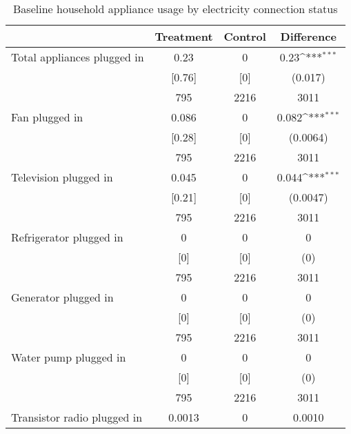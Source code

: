 \begin{table}[htbp]\centering
\def\sym#1{\ifmmode^{#1}\else\(^{#1}\)\fi}
\caption{Baseline household appliance usage by electricity connection status \label{tab:"balance"}}
\begin{tabular*}{0.9\hsize}{@{\hskip\tabcolsep\extracolsep\fill}l*{1}{ccc}}
\toprule
                                &Treatment&  Control&Difference         \\
\midrule
Total appliances plugged in     &     0.23&        0&     0.23\sym{***}\\
                                &   [0.76]&      [0]&  (0.017)         \\
                                &      795&     2216&     3011         \\
Fan plugged in                  &    0.086&        0&    0.082\sym{***}\\
                                &   [0.28]&      [0]& (0.0064)         \\
                                &      795&     2216&     3011         \\
Television plugged in           &    0.045&        0&    0.044\sym{***}\\
                                &   [0.21]&      [0]& (0.0047)         \\
                                &      795&     2216&     3011         \\
Refrigerator plugged in         &        0&        0&        0         \\
                                &      [0]&      [0]&      (0)         \\
                                &      795&     2216&     3011         \\
Generator plugged in            &        0&        0&        0         \\
                                &      [0]&      [0]&      (0)         \\
                                &      795&     2216&     3011         \\
Water pump plugged in           &        0&        0&        0         \\
                                &      [0]&      [0]&      (0)         \\
                                &      795&     2216&     3011         \\
Transistor radio plugged in     &   0.0013&        0&   0.0010         \\

\end{tabular*}
\end{table}
